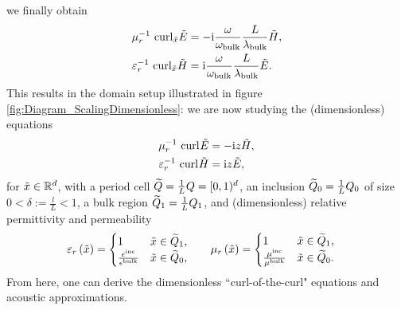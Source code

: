 we finally obtain
\begin{align*}
	\mu_r^{-1} \ \mathrm{curl}_{\tilde{x}}\tilde{E} 
	&= -\mathrm{i}\frac{\omega}{\omega_{\mathrm{bulk}}} \frac{L}{\lambda_{\mathrm{bulk}}} \tilde{H}, \\
	\varepsilon_r^{-1} \ \mathrm{curl}_{\tilde{x}}\tilde{H} 
	&= \mathrm{i}\frac{\omega}{\omega_{\mathrm{bulk}}} \frac{L}{\lambda_{\mathrm{bulk}}} \tilde{E}.
\end{align*}
This results in the domain setup illustrated in figure \ref{fig:Diagram_ScalingDimensionless}: we are now studying the (dimensionless) equations
\begin{subequations}
	\begin{align} \label{eq:Intro-NonDimMaxwell}
		\mu_r^{-1} \ \mathrm{curl}_{}\tilde{E} 
		&= -\mathrm{i} z \tilde{H}, \\
		\varepsilon_r^{-1} \ \mathrm{curl}_{}\tilde{H} 
		&= \mathrm{i} z \tilde{E},
	\end{align}
\end{subequations}
for $\tilde{x}\in\mathbb{R}^d$, with a period cell $\widetilde{Q} = \frac{1}{L}Q = [0,1)^d$, an inclusion $\widetilde{Q}_0 = \frac{1}{L} Q_0$ of size $0<\delta:=\frac{l}{L}<1$, a bulk region $\widetilde{Q}_1 = \frac{1}{L}Q_1$, and (dimensionless) relative permittivity and permeability
\begin{align*}
	\varepsilon_r\left( \tilde{x} \right) = 
	\begin{cases} 
		1 & \tilde{x}\in\widetilde{Q}_1, \\ 
		\frac{\epsilon^{\mathrm{inc}}}{\epsilon^{\mathrm{bulk}}} & \tilde{x}\in\widetilde{Q}_0, 
	\end{cases}
	&\qquad
	\mu_r\left( \tilde{x} \right) = 
	\begin{cases} 
		1 & \tilde{x}\in\widetilde{Q}_1, \\ 
		\frac{\mu^{\mathrm{inc}}}{\mu^{\mathrm{bulk}}} & \tilde{x}\in\widetilde{Q}_0.
	\end{cases}
\end{align*}
From here, one can derive the dimensionless ``curl-of-the-curl" equations and acoustic approximations.

